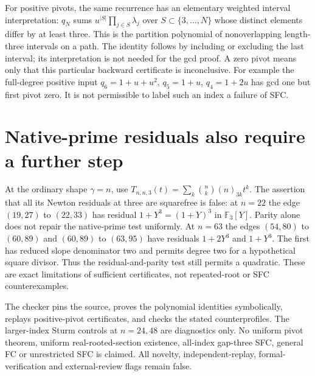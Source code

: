\documentclass[11pt]{article}
\begin{document}
For positive pivots, the same recurrence has an elementary weighted
interval interpretation: $q_N$ sums $u^{|S|}\prod_{j\in S}\lambda_j$
over $S\subset\{3,\ldots,N\}$ whose distinct elements differ by at least
three. This is the partition polynomial of nonoverlapping length-three
intervals on a path. The identity follows by including or excluding the
last interval; its interpretation is not needed for the gcd proof.
A zero pivot means only that this particular backward certificate is
inconclusive. For example the full-degree positive input
$q_6=1+u+u^2$, $q_5=1+u$, $q_4=1+2u$ has gcd one but first pivot zero.
It is not permissible to label such an index a failure of SFC.

\section{Native-prime residuals also require a further step}
At the ordinary shape $\gamma=n$, use
$T_{n,n,3}(t)=\sum_k\binom nk(n)_{3k}t^k$.
The assertion that all its Newton residuals at three are squarefree is
false: at $n=22$ the edge $(19,27)$ to $(22,33)$ has residual
$1+Y^3=(1+Y)^3$ in $\mathbb F_3[Y]$.
Parity alone does not repair the native-prime test uniformly.
At $n=63$ the edges $(54,80)$ to $(60,89)$ and $(60,89)$ to $(63,95)$
have residuals $1+2Y^3$ and $1+Y^3$.
The first has reduced slope denominator two and permits degree two
for a hypothetical square divisor. Thus the residual-and-parity test
still permits a quadratic. These are exact limitations of sufficient
certificates, not repeated-root or SFC counterexamples.

The checker pins the source, proves the polynomial identities symbolically,
replays positive-pivot certificates, and checks the stated counterprofiles.
The larger-index Sturm controls at $n=24,48$ are diagnostics only.
No uniform pivot theorem, uniform real-rooted-section existence,
all-index gap-three SFC, general FC or unrestricted SFC is claimed.
All novelty, independent-replay, formal-verification and external-review
flags remain false.
\end{document}
